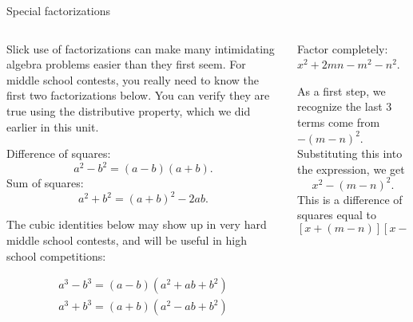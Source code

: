 \documentclass[9pt,aspectratio=169]{beamer}
\begin{document}
\begin{frame}{Special factorizations}
  \begin{columns}[T]
    \begin{column}{0.5\textwidth}
      Slick use of factorizations can make many intimidating algebra problems easier than they first seem.  For middle school contests, you really need to know the first two factorizations below.  You can verify they are true using the distributive property, which we did earlier in this unit.
      \begin{definition}
        Difference of squares: 
        \[ a^2 - b^2 = (a - b)(a + b). \]
        Sum of squares: 
        \[ a^2 + b^2 = (a + b)^2 - 2ab. \]
        \vspace*{-\intextsep}
      \end{definition}
      The cubic identities below may show up in very hard middle school contests, and will be useful in high school competitions:
      \begin{definition}
        \vspace*{-0.5\intextsep}
        \begin{gather*}          
          a^3 - b^3 = (a - b)(a^2 + ab + b^2)\\
          a^3 + b^3 = (a + b)(a^2 - ab + b^2)
        \end{gather*}
        \vspace*{-\intextsep}
      \end{definition}
    \end{column}
    \begin{column}{0.5\textwidth}
      \begin{problem}
        Factor completely: $x^2 + 2mn - m^2 - n^2$.
      \end{problem}

      As a first step, we recognize the last 3 terms come from $-(m - n)^2$.  Substituting this into the expression, we get
      \[x^2  - (m - n)^2.\]
      This is a difference of squares equal to 
      \[ [x + (m - n)][x - (m - n)] = (x + m - n)(x - m + n). \]
    \end{column}
  \end{columns}
\end{frame}
\end{document}
